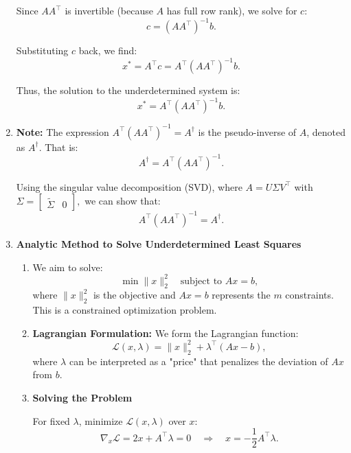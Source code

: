 \begin{derivation}
\begin{enumerate}
        Since \(A A^\top\) is invertible (because \(A\) has full row rank), we solve for \(c\):
        \[
        c = (A A^\top)^{-1} b.
        \]

        Substituting \(c\) back, we find:
        \[
        x^* = A^\top c = A^\top (A A^\top)^{-1} b.
        \]

        Thus, the solution to the underdetermined system is:
        \[
        x^* = A^\top (A A^\top)^{-1} b.
        \]

        \item \textbf{Note:} The expression \(A^\top (A A^\top)^{-1} = A^\dagger \) is the pseudo-inverse of \(A\), denoted as \(A^\dagger\). That is:
        \[
        A^\dagger = A^\top (A A^\top)^{-1}.
        \]

        Using the singular value decomposition (SVD), where \(A = U \Sigma V^\top\) with
        $
        \Sigma = 
        \begin{bmatrix}
        \tilde{\Sigma} & 0
        \end{bmatrix},
        $
        we can show that:
        \[
        A^\top (A A^\top)^{-1} = A^\dagger.
        \]

        \item \textbf{Analytic Method to Solve Underdetermined Least Squares}

        \begin{enumerate}
            \item We aim to solve:
            \[
            \min \|x\|_2^2 \quad \text{subject to } A x = b,
            \]
            where \(\|x\|_2^2\) is the objective and \(A x = b\) represents the \(m\) constraints. This is a constrained optimization problem.
            
            \item \textbf{Lagrangian Formulation:} We form the Lagrangian function:
            \[
            \mathcal{L}(x, \lambda) = \|x\|_2^2 + \lambda^\top (A x - b),
            \]
            where \(\lambda\) can be interpreted as a "price" that penalizes the deviation of \(A x\) from \(b\).
            
            \item \textbf{Solving the Problem}
            
            For fixed \(\lambda\), minimize \(\mathcal{L}(x, \lambda)\) over \(x\):
            \[
            \nabla_x \mathcal{L} = 2x + A^\top \lambda = 0 \quad \Rightarrow \quad x = -\frac{1}{2} A^\top \lambda.
            \]
            

\end{enumerate}
\end{enumerate}
\end{derivation}
